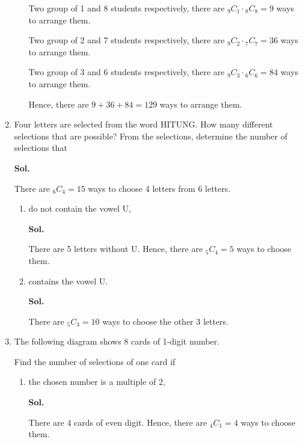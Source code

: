 \documentclass{report}
\newcommand\comb[2][^n]{{}_{#1}C_{#2}}
\newcommand{\sol}[1]{

      \noindent \textbf{Sol.}
}
\def\eos{\quad\hbox{\rlap{\hbox{\vrule depth 1.5pt height 2.6mm width 0.2mm \hskip 1mm \vrule height 2.6mm width 0.2mm}}{\vbox{\hrule height 0.2mm width 1.4mm \vskip 2.8mm \hrule depth 1.5pt height -0.35mm width 1.2mm}}}}
\begin{document}
\begin{multicols*}{2}
\begin{enumerate}
\begin{enumerate}
                              Two group of 1 and 8 students respectively, there are $\comb[9]{1} \cdot
                                    \comb[8]{8} = 9$ ways to arrange them.

                              Two group of 2 and 7 students respectively, there are $\comb[9]{2} \cdot
                                    \comb[7]{7} = 36$ ways to arrange them.

                              Two group of 3 and 6 students respectively, there are $\comb[9]{3} \cdot
                                    \comb[6]{6} = 84$ ways to arrange them.

                              Hence, there are $9 + 36 + 84 = 129$ ways to arrange them. $\eos$

                  \end{enumerate}

            \item Four letters are selected from the word HITUNG. How many different selections
                  that are possible? From the selections, determine the number of selections that
                  \sol{}

                  There are $\comb[6]{4} = 15$ ways to choose 4 letters from 6 letters.
                  \begin{enumerate}
                        \item do not contain the vowel U, \sol{}

                              There are 5 letters without U. Hence, there are $\comb[5]{4} = 5$ ways to
                              choose them. $\eos$

                        \item contains the vowel U. \sol{}

                              There are $\comb[5]{3} = 10$ ways to choose the other 3 letters. $\eos$
                  \end{enumerate}

            \item The following diagram shows 8 cards of 1-digit number.

                  Find the number of selections of one card if

                  \begin{enumerate}
                        \item the chosen number is a multiple of 2, \sol{}

                              There are 4 cards of even digit. Hence, there are $\comb[4]{1} = 4$ ways to
                              choose them. $\eos$


\end{enumerate}
\end{enumerate}
\end{multicols*}
\end{document}
